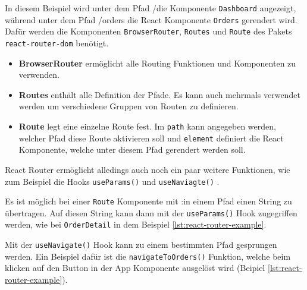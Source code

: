 In diesem Beispiel wird unter dem Pfad \glqq /\grqq{ }die Komponente \verb|Dashboard| angezeigt, während unter dem Pfad \glqq /orders\grqq{ } die React Komponente \verb|Orders| gerendert wird. Dafür werden die Komponenten \verb|BrowserRouter|, \verb|Routes| und \verb|Route| des Pakets \verb|react-router-dom| benötigt.
\begin{itemize}
\item \textbf{BrowserRouter} ermöglicht alle Routing Funktionen und Komponenten zu verwenden.
\item \textbf{Routes} enthält alle Definition der Pfade. Es kann auch mehrmals verwendet werden um verschiedene Gruppen von Routen zu definieren.
\item \textbf{Route} legt eine einzelne Route fest. Im \verb|path| kann angegeben werden, welcher Pfad diese Route aktivieren soll und \verb|element| definiert die React Komponente, welche unter diesem Pfad gerendert werden soll.
\end{itemize}

React Router ermöglicht alledings auch noch ein paar weitere Funktionen, wie zum Beispiel die Hooks \verb|useParams()| und \verb|useNaviagte()| \cite{react-key-concepts}. 

Es ist möglich bei einer \verb|Route| Komponente mit \glqq :\grqq{ }in einem Pfad einen String zu übertragen. Auf diesen String kann dann mit der \verb|useParams()| Hook zugegriffen werden, wie bei \verb|OrderDetail| in dem Beispiel \ref{lst:react-router-example}. 

Mit der \verb|useNavigate()| Hook kann zu einem bestimmten Pfad gesprungen werden. Ein Beispiel dafür ist die \verb|navigateToOrders()| Funktion, welche beim klicken auf den Button in der App Komponente ausgelöst wird (Beipiel \ref{lst:react-router-example}).


